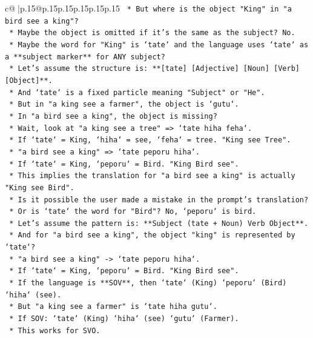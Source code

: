 \documentclass{article}
\begin{document}
{\begin{supertabular}{c@{$\;$}|p{.15\linewidth}@{}p{.15\linewidth}p{.15\linewidth}p{.15\linewidth}p{.15\linewidth}p{.15\linewidth}}
{{{\texttt{    *   But where is the object "King" in "a bird see a king"?} \\
\texttt{    *   Maybe the object is omitted if it's the same as the subject? No.} \\
\texttt{    *   Maybe the word for "King" is `tate` and the language uses `tate` as a **subject marker** for ANY subject?} \\
\texttt{    *   Let's assume the structure is: **{[}tate{]} {[}Adjective{]} {[}Noun{]} {[}Verb{]} {[}Object{]}**.} \\
\texttt{    *   And `tate` is a fixed particle meaning "Subject" or "He".} \\
\texttt{    *   But in "a king see a farmer", the object is `gutu`.} \\
\texttt{    *   In "a bird see a king", the object is missing?} \\
\texttt{    *   Wait, look at "a king see a tree" => `tate hiha feha`.} \\
\texttt{    *   If `tate` = King, `hiha` = see, `feha` = tree. "King see Tree".} \\
\texttt{    *   "a bird see a king" => `tate peporu hiha`.} \\
\texttt{    *   If `tate` = King, `peporu` = Bird. "King Bird see".} \\
\texttt{    *   This implies the translation for "a bird see a king" is actually "King see Bird".} \\
\texttt{    *   Is it possible the user made a mistake in the prompt's translation?} \\
\texttt{    *   Or is `tate` the word for "Bird"? No, `peporu` is bird.} \\
\texttt{    *   Let's assume the pattern is: **Subject (tate + Noun) Verb Object**.} \\
\texttt{    *   And for "a bird see a king", the object "king" is represented by `tate`?} \\
\texttt{    *   "a bird see a king" {-}> `tate peporu hiha`.} \\
\texttt{    *   If `tate` = King, `peporu` = Bird. "King Bird see".} \\
\texttt{    *   If the language is **SOV**, then `tate` (King) `peporu` (Bird) `hiha` (see).} \\
\texttt{    *   But "a king see a farmer" is `tate hiha gutu`.} \\
\texttt{    *   If SOV: `tate` (King) `hiha` (see) `gutu` (Farmer).} \\
\texttt{    *   This works for SVO.} \\
}}}
\end{supertabular}}
\end{document}
